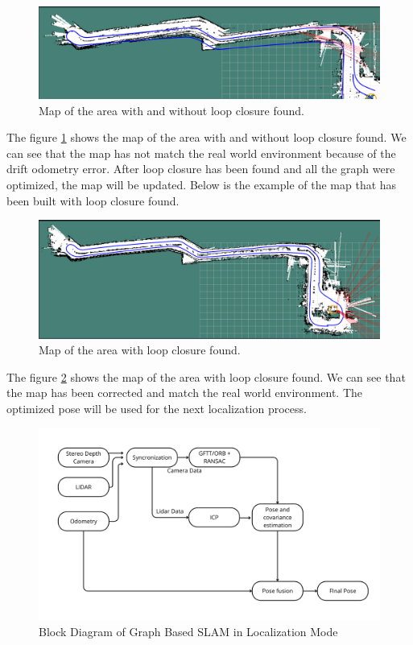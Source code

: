 \documentclass[conference]{IEEEtran}
\begin{document}
\begin{figure}[H]
	\centering
	\includegraphics[width=\linewidth]{../konten/map_salah.png}
	\caption{Map of the area with and without loop closure found.}
	\label{fig:map}
\end{figure}

The figure \ref{fig:map} shows the map of the area with and without loop closure found. We can see that the map has not match the real world environment because of the drift odometry error. After loop closure has been found and all the graph were optimized, the map will be updated. Below is the example of the map that has been built with loop closure found.

\begin{figure}[H]
	\centering
	\includegraphics[width=\linewidth]{../konten/map_benar.png}
	\caption{Map of the area with loop closure found.}
	\label{fig:map_corrected}
\end{figure}

The figure \ref{fig:map_corrected} shows the map of the area with loop closure found. We can see that the map has been corrected and match the real world environment. The optimized pose will be used for the next localization process.

\begin{figure}[H]
	\centering
	\includegraphics[width=\linewidth]{../konten/nav_loc2.png}
	\caption{Block Diagram of Graph Based SLAM in Localization Mode}
	\label{fig:slam_system_loc}
\end{figure} 
\end{document}
